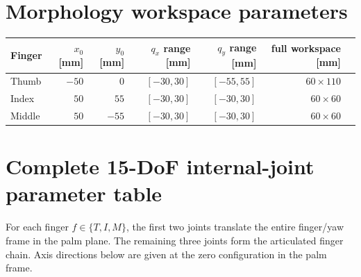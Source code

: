 \documentclass[11pt]{article}
\begin{document}
\vspace{1mm}
\section*{Morphology workspace parameters}
\begin{center}
\begin{tabular}{lrrrrrr}
\toprule
Finger & $x_0$ [mm] & $y_0$ [mm] & $q_x$ range [mm] & $q_y$ range [mm] & full workspace [mm] \\
\midrule
Thumb  & $-50$ & $0$   & $[-30,30]$ & $[-55,55]$ & $60\times110$ \\
Index  & $ 50$ & $55$  & $[-30,30]$ & $[-30,30]$ & $60\times60$ \\
Middle & $ 50$ & $-55$ & $[-30,30]$ & $[-30,30]$ & $60\times60$ \\
\bottomrule
\end{tabular}
\end{center}

\section*{Complete 15-DoF internal-joint parameter table}
For each finger $f\in\{T,I,M\}$, the first two joints translate the entire finger/yaw frame in the palm plane. The remaining three joints form the articulated finger chain. Axis directions below are given at the zero configuration in the palm frame.
\end{document}
